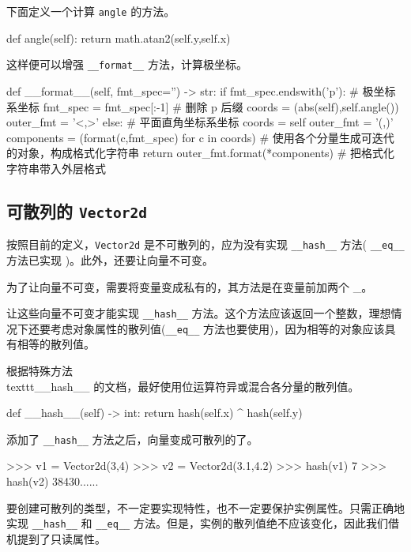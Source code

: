 下面定义一个计算 \texttt{angle} 的方法。
\begin{python}
def angle(self):
    return math.atan2(self.y,self.x)
\end{python}

这样便可以增强 \texttt{\_\_format\_\_} 方法，计算极坐标。

\begin{python}
def __format__(self, fmt_spec='') -> str:
if fmt_spec.endswith('p'):      # 极坐标系坐标
    fmt_spec = fmt_spec[:-1]    # 删除 p 后缀
    coords = (abs(self),self.angle())
    outer_fmt = '<{},{}>'
else:                           # 平面直角坐标系坐标
    coords = self
    outer_fmt = '({},{})'
components = (format(c,fmt_spec) for c in coords)   # 使用各个分量生成可迭代的对象，构成格式化字符串
return outer_fmt.format(*components)    # 把格式化字符串带入外层格式
\end{python}

\subsection{可散列的 \texttt{Vector2d}}

按照目前的定义，\texttt{Vector2d} 是不可散列的，应为没有实现 \texttt{\_\_hash\_\_} 方法( \texttt{\_\_eq\_\_} 方法已实现 )。此外，还要让向量不可变。

为了让向量不可变，需要将变量变成私有的，其方法是在变量前加两个 \_。



让这些向量不可变才能实现 \texttt{\_\_hash\_\_} 方法。这个方法应该返回一个整数，理想情况下还要考虑对象属性的散列值(\texttt{\_\_eq\_\_} 方法也要使用)，因为相等的对象应该具有相等的散列值。

根据特殊方法 \\texttt{\_\_hash\_\_} 的文档，最好使用位运算符异或混合各分量的散列值。

\begin{python}
def __hash__(self) -> int:
    return hash(self.x) ^ hash(self.y)
\end{python}

添加了 \texttt{\_\_hash\_\_} 方法之后，向量变成可散列的了。

\begin{python}
>>> v1 = Vector2d(3,4)
>>> v2 = Vector2d(3.1,4.2)
>>> hash(v1)
7
>>> hash(v2)
38430......
\end{python}

要创建可散列的类型，不一定要实现特性，也不一定要保护实例属性。只需正确地实现 \texttt{\_\_hash\_\_} 和 \texttt{\_\_eq\_\_} 方法。但是，实例的散列值绝不应该变化，因此我们借机提到了只读属性。

